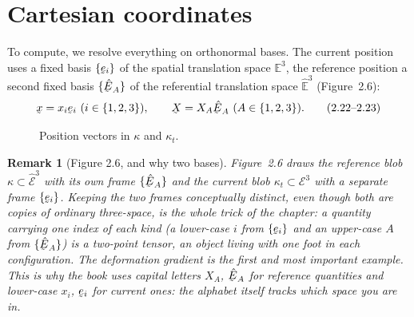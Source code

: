\documentclass[17pt,a4paper]{extreport}
\DeclareRobustCommand{\vek}[1]{\underaccent{\tilde}{#1}}
\newcommand{\blob}[1]{\draw[#1] plot[smooth cycle,tension=0.85] coordinates
  {(0,1.05) (1.15,0.72) (1.5,-0.35) (0.6,-1.15) (-0.75,-0.95) (-1.3,0.05)};}
\newcommand{\Et}{\mathcal{E}^{3}}          %
\newcommand{\hEt}{\hat{\mathcal{E}}^{3}}    %
\newcommand{\Vt}{\mathbb{E}^{3}}            %
\newcommand{\hVt}{\hat{\mathbb{E}}^{3}}     %
\newcommand{\bx}{\vek{x}}
\newcommand{\bX}{\vek{X}}
\newcommand{\be}{\vek{e}}
\newcommand{\hbE}{\hat{\vek{E}}}
\theoremstyle{scplain}
\theoremstyle{scdefn}
\newtheorem{remark}[theorem]{Remark}
\begin{document}
\section{Cartesian coordinates}\label{sec:cart}

To compute, we resolve everything on orthonormal bases. The current
position uses a fixed basis $\{\be_i\}$ of the spatial translation space
$\Vt$, the reference position a second fixed basis $\{\hbE_A\}$ of the
referential translation space $\hVt$ (Figure~2.6):
\begin{equation}
   \bx=x_i\be_i\ (i\in\{1,2,3\}),\qquad
   \bX=X_A\hbE_A\ (A\in\{1,2,3\}). \tag{2.22--2.23}\label{eq:2.22}
\end{equation}

\begin{figure}[htbp]\centering
{}
\caption{Position vectors in $\kappa$ and $\kappa_t$.}\label{fig:2.6}
\end{figure}

\begin{remark}[Figure 2.6, and why two bases]\label{rem:fig6}
Figure~2.6 draws the reference blob $\kappa\subset\hEt$ with its own frame
$\{\hbE_A\}$ and the current blob $\kappa_t\subset\Et$ with a separate frame
$\{\be_i\}$. Keeping the two frames \emph{conceptually distinct}, even
though both are copies of ordinary three-space, is the whole trick of the
chapter: a quantity carrying one index of each kind (a lower-case $i$ from
$\{\be_i\}$ and an upper-case $A$ from $\{\hbE_A\}$) is a \emph{two-point
tensor}, an object living with one foot in each configuration. The
deformation gradient is the first and most important example. This is why
the book uses capital letters $X_A$, $\hbE_A$ for reference quantities and
lower-case $x_i$, $\be_i$ for current ones: the alphabet itself tracks which
space you are in.
\end{remark}
\end{document}
